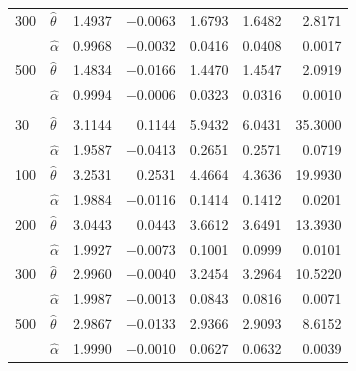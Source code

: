 \documentclass[11pt,reqno]{amsart}
\numberwithin{equation}{section}
\theoremstyle{plain}
\theoremstyle{definition}
\theoremstyle{remark}
\begin{document}
\begin{table}[htbp]
\begin{tabular}{@{}llrrrrr@{}}
300 & $\widehat\theta$  & 1.4937 & $-$0.0063 & 1.6793 & 1.6482 & 2.8171\\
    & $\widehat\alpha$  & 0.9968 & $-$0.0032 & 0.0416 & 0.0408 & 0.0017\\
500 & $\widehat\theta$  & 1.4834 & $-$0.0166 & 1.4470 & 1.4547 & 2.0919\\
    & $\widehat\alpha$  & 0.9994 & $-$0.0006 & 0.0323 & 0.0316 & 0.0010\\
\addlinespace
\multicolumn{7}{@{}l}{\itshape Scenario 3: $\theta=3.0$, $\alpha=2.0$}\\
30  & $\widehat\theta$  & 3.1144 & \phantom{$-$}0.1144 & 5.9432 & 6.0431 & 35.3000\\
    & $\widehat\alpha$  & 1.9587 & $-$0.0413 & 0.2651 & 0.2571 & 0.0719\\
100 & $\widehat\theta$  & 3.2531 & \phantom{$-$}0.2531 & 4.4664 & 4.3636 & 19.9930\\
    & $\widehat\alpha$  & 1.9884 & $-$0.0116 & 0.1414 & 0.1412 & 0.0201\\
200 & $\widehat\theta$  & 3.0443 & \phantom{$-$}0.0443 & 3.6612 & 3.6491 & 13.3930\\
    & $\widehat\alpha$  & 1.9927 & $-$0.0073 & 0.1001 & 0.0999 & 0.0101\\
300 & $\widehat\theta$  & 2.9960 & $-$0.0040 & 3.2454 & 3.2964 & 10.5220\\
    & $\widehat\alpha$  & 1.9987 & $-$0.0013 & 0.0843 & 0.0816 & 0.0071\\
500 & $\widehat\theta$  & 2.9867 & $-$0.0133 & 2.9366 & 2.9093 & 8.6152\\
    & $\widehat\alpha$  & 1.9990 & $-$0.0010 & 0.0627 & 0.0632 & 0.0039\\
\bottomrule
\end{tabular}
\end{table}
\end{document}
